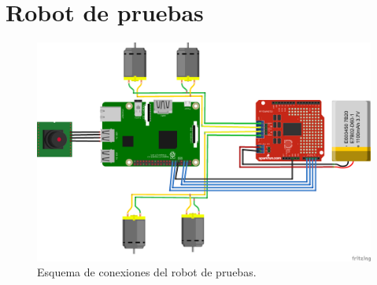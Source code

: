 \chapter{Robot de pruebas}
\label{chap:robot}

\begin{figure}
  \begin{center}
    \includegraphics[scale=0.4]{imagenes/robot/robot-esquema.png}
  \end{center}
  \caption{Esquema de conexiones del robot de pruebas.}
  \label{gantt:tareas01}
\end{figure}
